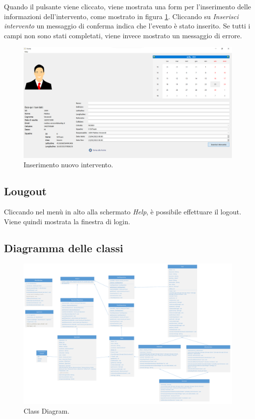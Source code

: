 Quando il pulsante viene cliccato, viene mostrata una form per l'inserimento delle informazioni dell'intervento, come mostrato in figura \ref{fig:new_op}. Cliccando su \textit{Inserisci intervento} un messaggio di conferma indica che l'evento è stato inserito. Se tutti i campi non sono stati completati, viene invece mostrato un messaggio di errore.

\begin{figure}[h!]
	\centering
	\includegraphics[width=1\linewidth]{./ImageFiles/new_op.png}
	\caption{Inserimento nuovo intervento.}
	\label{fig:new_op}
\end{figure}

\subsection{Lougout}
Cliccando nel menù in alto alla schermato \textit{Help}, è possibile effettuare il logout. Viene quindi mostrata la finestra di login.

\begin{landscape}
	\section{Diagramma delle classi}
	\begin{figure}[h!]
		\centering
		\includegraphics[width=0.9\linewidth]{./OtherFiles/Class Diagram}
		\caption{Class Diagram.}
		\label{fig:class_diagram}
	\end{figure}
\end{landscape}


